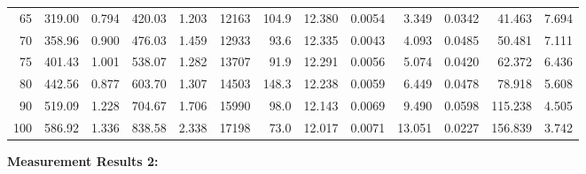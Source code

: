 \documentclass[10pt]{article}
\begin{document}
{\begin{tabular}{|r|rr|rr|rr|rr|rr|r|r|}
       65 &       319.00 &        0.794 &       420.03 &        1.203 &        12163 &        104.9 &       12.380 &       0.0054 &        3.349 &       0.0342 &       41.463 &        7.694 \\
       70 &       358.96 &        0.900 &       476.03 &        1.459 &        12933 &         93.6 &       12.335 &       0.0043 &        4.093 &       0.0485 &       50.481 &        7.111 \\
       75 &       401.43 &        1.001 &       538.07 &        1.282 &        13707 &         91.9 &       12.291 &       0.0056 &        5.074 &       0.0420 &       62.372 &        6.436 \\
       80 &       442.56 &        0.877 &       603.70 &        1.307 &        14503 &        148.3 &       12.238 &       0.0059 &        6.449 &       0.0478 &       78.918 &        5.608 \\
       90 &       519.09 &        1.228 &       704.67 &        1.706 &        15990 &         98.0 &       12.143 &       0.0069 &        9.490 &       0.0598 &      115.238 &        4.505 \\
      100 &       586.92 &        1.336 &       838.58 &        2.338 &        17198 &         73.0 &       12.017 &       0.0071 &       13.051 &       0.0227 &      156.839 &        3.742 \\
\hline
\end{tabular}
}

\vspace{3mm}

\noindent
{\large \bf Measurement Results 2:}
\vspace{3mm}
\end{document}

